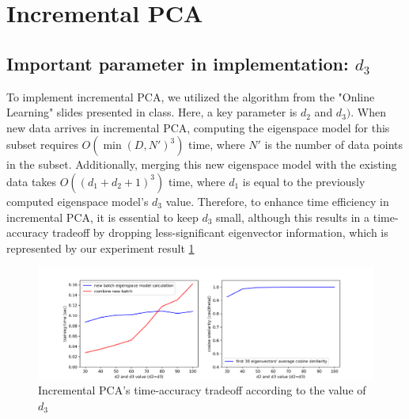 \section{Incremental PCA}
\label{sec:intro}

\subsection{Important parameter in implementation: $d_3$}
To implement incremental PCA, we utilized the algorithm from the "Online Learning" slides presented in class. Here, a key parameter is $d_2$ and $d_3)$. When new data arrives in incremental PCA, computing the eigenspace model for this subset requires $O(\min(D, N')^3)$ time, where $N'$ is the number of data points in the subset. Additionally, merging this new eigenspace model with the existing data takes $O((d_1 + d_2 + 1)^3)$ time, where $d_1$ is equal to the previously computed eigenspace model's $d_3$ value. Therefore, to enhance time efficiency in incremental PCA, it is essential to keep $d_3$ small, although this results in a time-accuracy tradeoff by dropping less-significant eigenvector information, which is represented by our experiment result \cref{fig:q2-fig5}

\begin{figure}[t]
	\centering
	\includegraphics[width=\linewidth]{image/q2-fig5.png}
	
	\caption{Incremental PCA's time-accuracy tradeoff according to the value of $d_3$}
	\label{fig:q2-fig5}
\end{figure}

